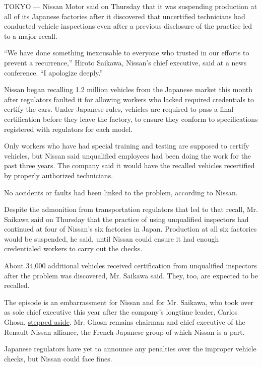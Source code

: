 TOKYO --- Nissan Motor said on Thursday that it was suspending
production at all of its Japanese factories after it discovered that
uncertified technicians had conducted vehicle inspections even after a
previous disclosure of the practice led to a major recall.

``We have done something inexcusable to everyone who trusted in our
efforts to prevent a recurrence,'' Hiroto Saikawa, Nissan's chief
executive, said at a news conference. ``I apologize deeply.''

Nissan began recalling 1.2 million vehicles from the Japanese market
this month after regulators faulted it for allowing workers who lacked
required credentials to certify the cars. Under Japanese rules, vehicles
are required to pass a final certification before they leave the
factory, to ensure they conform to specifications registered with
regulators for each model.

Only workers who have had special training and testing are supposed to
certify vehicles, but Nissan said unqualified employees had been doing
the work for the past three years. The company said it would have the
recalled vehicles recertified by properly authorized technicians.

No accidents or faults had been linked to the problem, according to
Nissan.

Despite the admonition from transportation regulators that led to that
recall, Mr. Saikawa said on Thursday that the practice of using
unqualified inspectors had continued at four of Nissan's six factories
in Japan. Production at all six factories would be suspended, he said,
until Nissan could ensure it had enough credentialed workers to carry
out the checks.

About 34,000 additional vehicles received certification from unqualified
inspectors after the problem was discovered, Mr. Saikawa said. They,
too, are expected to be recalled.

The episode is an embarrassment for Nissan and for Mr. Saikawa, who took
over as sole chief executive this year after the company's longtime
leader, Carlos Ghosn,
\href{https://www.nytimes.com/2017/02/22/business/nissan-executive-carlos-ghosn.html}{stepped
aside}. Mr. Ghosn remains chairman and chief executive of the
Renault-Nissan alliance, the French-Japanese group of which Nissan is a
part.

Japanese regulators have yet to announce any penalties over the improper
vehicle checks, but Nissan could face fines.

